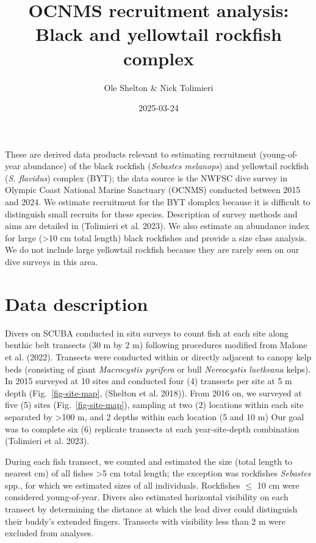 \documentclass[
  letterpaper,
  DIV=11,
  numbers=noendperiod]{scrartcl}
\title{OCNMS recruitment analysis: Black and yellowtail rockfish
complex}
\author{Ole Shelton \& Nick Tolimieri}
\date{2025-03-24}
\begin{document}
\maketitle
\ifdefined\Shaded\renewenvironment{Shaded}{\begin{tcolorbox}[interior hidden, sharp corners, borderline west={3pt}{0pt}{shadecolor}, frame hidden, enhanced, breakable, boxrule=0pt]}{\end{tcolorbox}}\fi

These are derived data products relevant to estimating recruitment
(young-of-year abundance) of the black rockfish (\emph{Sebastes
melanops}) and yellowtail rockfish (\emph{S. flavidus}) complex (BYT);
the data source is the NWFSC dive survey in Olympic Coast National
Marine Sanctuary (OCNMS) conducted between 2015 and 2024. We estimate
recruitment for the BYT domplex because it is difficult to distinguish
small recruits for these species. Description of survey methods and aims
are detailed in (Tolimieri et al. 2023). We also estimate an abundance
index for large (\textgreater10 cm total length) black rockfishes and
provide a size class analysis. We do not include large yellowtail
rockfish because they are rarely seen on our dive surveys in this area.

\hypertarget{data-description}{%
\section{Data description}\label{data-description}}

Divers on SCUBA conducted in situ surveys to count fish at each site
along benthic belt transects (30 m by 2 m) following procedures modified
from Malone et al. (2022). Transects were conducted within or directly
adjacent to canopy kelp beds (consisting of giant \emph{Macrocystis
pyrifera} or bull \emph{Nereocystis luetkeana} kelps). In 2015 surveyed
at 10 sites and conducted four (4) transects per site at 5 m depth
(Fig.~\ref{fig-site-map}, (Shelton et al. 2018)). From 2016 on, we
surveyed at five (5) sites (Fig.~\ref{fig-site-map}), sampling at two
(2) locations within each site separated by \textgreater100 m, and 2
depths within each location (5 and 10 m) Our goal was to complete six
(6) replicate transects at each year-site-depth combination (Tolimieri
et al. 2023).

During each fish transect, we counted and estimated the size (total
length to nearest cm) of all fishes \textgreater5 cm total length; the
exception was rockfishes \emph{Sebastes} spp., for which we estimated
sizes of all individuals. Rockfishes \(\leq\) 10 cm were considered
young-of-year. Divers also estimated horizontal visibility on each
transect by determining the distance at which the lead diver could
distinguish their buddy's extended fingers. Transects with visibility
less than 2 m were excluded from analyses.
\end{document}
